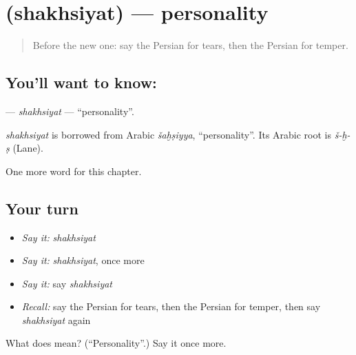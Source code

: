 \section[\texorpdfstring{\fa{شخصیت} (shakhsiyat)}{شخصیت (shakhsiyat)}]{ (shakhsiyat) — personality}

\label{lesson:FA-C170-shakhsiyat}



\begin{quote}
Before the new one: say the Persian for tears, then the Persian for temper.
\end{quote}

\subsection*{You'll want to know: }
\textbf{} — \emph{shakhsiyat} — \textquotedblleft{}personality\textquotedblright{}.

\begin{cousinweb}
\emph{shakhsiyat} is borrowed from Arabic \emph{šaḫṣiyya}, \textquotedblleft{}personality\textquotedblright{}. Its Arabic root is \emph{š-ḫ-ṣ} (Lane).
\end{cousinweb}

\begin{grammarlens}[title={What you've built}]
One more word for this chapter.
\end{grammarlens}

\subsection*{Your turn}
\begin{itemize}
\raggedright
  \item \emph{Say it:} \emph{shakhsiyat}
  \item \emph{Say it:} \emph{shakhsiyat}, once more
  \item \emph{Say it:} say \emph{shakhsiyat}
  \item \emph{Recall:} say the Persian for tears, then the Persian for temper, then say \emph{shakhsiyat} again
\end{itemize}

\begin{tcolorbox}[breakable,colback=teal!4,colframe=teal!35!black,title={Before you move on}]
What does  mean? (\textquotedblleft{}Personality\textquotedblright{}.) Say it once more.
\end{tcolorbox}
